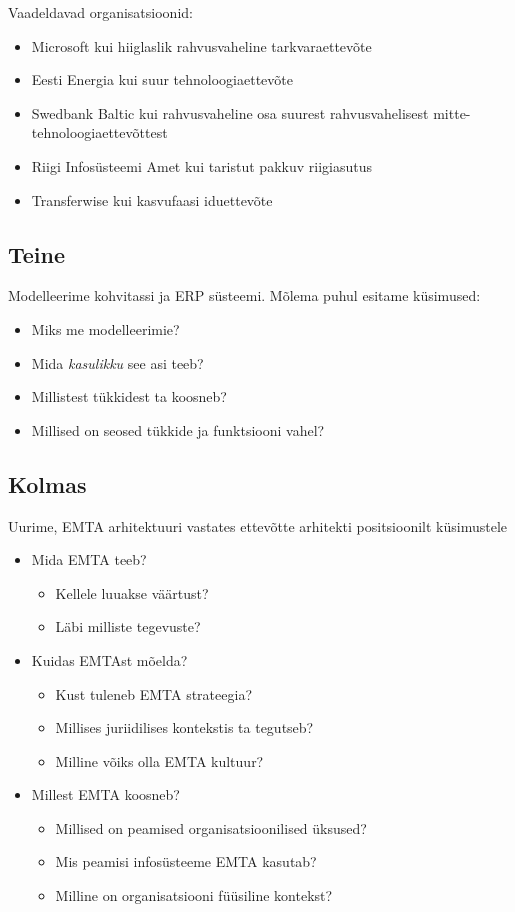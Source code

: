 \documentclass[nobib]{tufte-handout}
\begin{document}
Vaadeldavad organisatsioonid:
\begin{itemize}
	\item Microsoft kui hiiglaslik rahvusvaheline tarkvaraettevõte
	\item Eesti Energia kui suur tehnoloogiaettevõte
	\item Swedbank Baltic kui rahvusvaheline osa suurest rahvusvahelisest mitte-tehnoloogiaettevõttest
	\item Riigi Infosüsteemi Amet kui taristut pakkuv riigiasutus
	\item Transferwise kui kasvufaasi iduettevõte
\end{itemize}

\subsection{Teine}
Modelleerime kohvitassi ja ERP süsteemi. Mõlema puhul esitame küsimused:
\begin{itemize}
	\item Miks me modelleerimie?
	\item Mida \emph{kasulikku} see asi teeb?
	\item Millistest tükkidest ta koosneb?
	\item Millised on seosed tükkide ja funktsiooni vahel?
\end{itemize}

\subsection{Kolmas}
Uurime, EMTA arhitektuuri vastates ettevõtte arhitekti positsioonilt küsimustele
\begin{itemize}
	\item Mida EMTA teeb?
	\begin{itemize}
		\item Kellele luuakse väärtust?
		\item Läbi milliste tegevuste?
	\end{itemize}
	\item Kuidas EMTAst mõelda?
	\begin{itemize}
		\item Kust tuleneb EMTA strateegia?
		\item Millises juriidilises kontekstis ta tegutseb?
		\item Milline võiks olla EMTA kultuur?
	\end{itemize}
	\item Millest EMTA koosneb?
	\begin{itemize}
		\item Millised on peamised organisatsioonilised üksused?
		\item Mis peamisi infosüsteeme EMTA kasutab?
		\item Milline on organisatsiooni füüsiline kontekst?
	\end{itemize}
\end{itemize}
\end{document}

